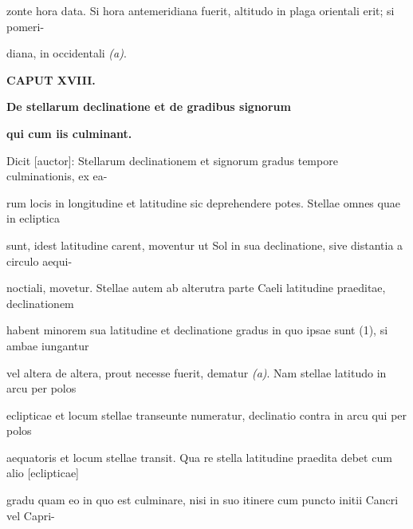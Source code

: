 \documentclass[11pt]{article}
\begin{document}
\noindent\hypertarget{AB01-PDF0120-body-L015}{}zonte hora data. Si hora antemeridiana fuerit, altitudo in plaga orientali erit; si pomeri-\strut\par
\noindent\hypertarget{AB01-PDF0120-body-L016}{}diana, in occidentali \textit{(a)}.\strut\par
\hypertarget{AB01-PDF0120-body-L017}{}\begin{center}\bfseries CAPUT XVIII.\end{center}
\hypertarget{AB01-PDF0120-body-L018}{}\begin{center}\bfseries De stellarum declinatione et de gradibus signorum\end{center}
\hypertarget{AB01-PDF0120-body-L019}{}\begin{center}\bfseries qui cum iis culminant.\end{center}
\noindent\hypertarget{AB01-PDF0120-body-L020}{}Dicit [auctor]: Stellarum declinationem et signorum gradus tempore culminationis, ex ea-\strut\par
\noindent\hypertarget{AB01-PDF0120-body-L021}{}rum locis in longitudine et latitudine sic deprehendere potes. Stellae omnes quae in ecliptica\strut\par
\noindent\hypertarget{AB01-PDF0120-body-L022}{}sunt, idest latitudine carent, moventur ut Sol in sua declinatione, sive distantia a circulo aequi-\strut\par
\noindent\hypertarget{AB01-PDF0120-body-L023}{}noctiali, movetur. Stellae autem ab alterutra parte Caeli latitudine praeditae, declinationem\strut\par
\noindent\hypertarget{AB01-PDF0120-body-L024}{}habent minorem sua latitudine et declinatione gradus in quo ipsae sunt (1), si ambae iungantur\strut\par
\noindent\hypertarget{AB01-PDF0120-body-L025}{}vel altera de altera, prout necesse fuerit, dematur \textit{(a)}. Nam stellae latitudo in arcu per polos\strut\par
\noindent\hypertarget{AB01-PDF0120-body-L026}{}eclipticae et locum stellae transeunte numeratur, declinatio contra in arcu qui per polos\strut\par
\noindent\hypertarget{AB01-PDF0120-body-L027}{}aequatoris et locum stellae transit. Qua re stella latitudine praedita debet cum alio [eclipticae]\strut\par
\noindent\hypertarget{AB01-PDF0120-body-L028}{}gradu quam eo in quo est culminare, nisi in suo itinere cum puncto initii Cancri vel Capri-\strut\par
\end{document}
